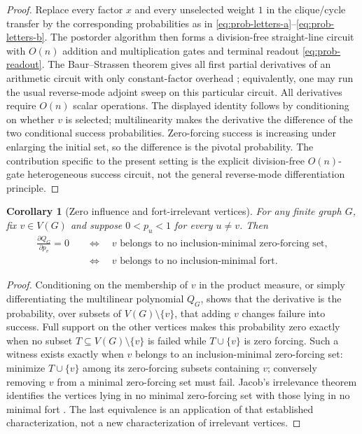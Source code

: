 \documentclass[11pt,reqno]{amsart}
\newtheorem{corollary}[corollary]{Corollary}
\theoremstyle{definition}
\begin{document}
\begin{proof}
Replace every factor $x$ and every unselected weight $1$ in the clique/cycle
transfer by the corresponding probabilities as in
\eqref{eq:prob-letters-a}--\eqref{eq:prob-letters-b}.  The postorder algorithm
then forms a division-free straight-line circuit with $O(n)$ addition and
multiplication gates and terminal readout \eqref{eq:prob-readout}.  The
Baur--Strassen theorem gives all first partial derivatives of an arithmetic
circuit with only constant-factor overhead \cite{BaurStrassen1983}; equivalently,
one may run the usual reverse-mode adjoint sweep on this particular circuit.
All derivatives require $O(n)$ scalar operations.  The displayed identity
follows by conditioning on whether $v$ is selected; multilinearity makes the
derivative the difference of the two conditional success probabilities.
Zero-forcing success is increasing under enlarging the initial set, so the
difference is the pivotal probability.  The contribution specific to the
present setting is the explicit division-free $O(n)$-gate heterogeneous
success circuit, not the general reverse-mode differentiation principle.
\end{proof}

\begin{corollary}[Zero influence and fort-irrelevant vertices]
\label{cor:zero-influence-fort}
For any finite graph $G$, fix $v\in V(G)$ and suppose $0<p_u<1$ for every
$u\ne v$.  Then
\[
\begin{aligned}
 \frac{\partial Q_G}{\partial p_v}=0
 &\quad\Longleftrightarrow\quad
 v\text{ belongs to no inclusion-minimal zero-forcing set},\\
 &\quad\Longleftrightarrow\quad
 v\text{ belongs to no inclusion-minimal fort}.
\end{aligned}
\]
\end{corollary}

\begin{proof}
Conditioning on the membership of $v$ in the product measure, or simply
differentiating the multilinear polynomial $Q_G$, shows that the derivative is
the probability, over subsets of $V(G)\setminus\{v\}$, that adding $v$
changes failure into success.  Full
support on the other vertices makes this probability zero exactly when no
subset $T\subseteq V(G)\setminus\{v\}$ is failed while $T\cup\{v\}$ is
zero forcing.  Such a witness exists exactly when $v$ belongs to an
inclusion-minimal zero-forcing set: minimize $T\cup\{v\}$ among its
zero-forcing subsets containing $v$; conversely removing $v$ from a minimal
zero-forcing set must fail.  Jacob's irrelevance theorem identifies the
vertices lying in no minimal zero-forcing set with those lying in no minimal
fort \cite[Theorem~2.4]{Jacob2025}.  The last equivalence is an application
of that established characterization, not a new characterization of
irrelevant vertices.
\end{proof}
\end{document}
